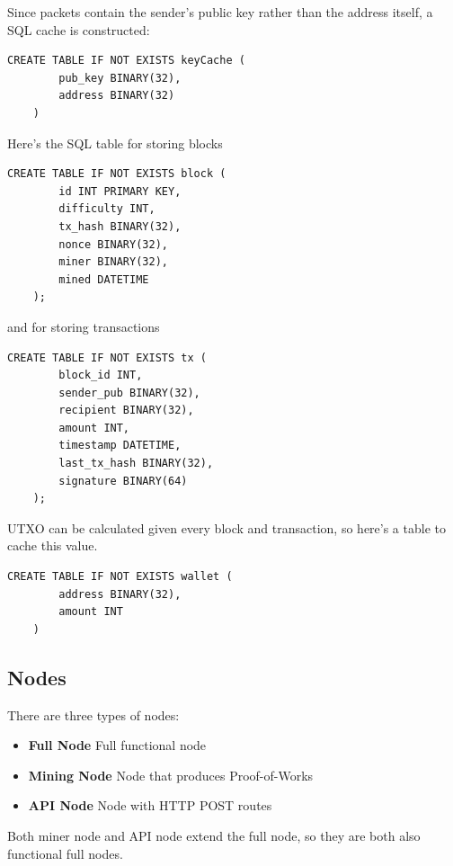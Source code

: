 \documentclass[../documentation.tex]{subfiles}
\begin{document}
Since  packets contain the sender's public key rather than the
address itself, a SQL cache is constructed:

\begin{lstlisting}[style=sql]
	CREATE TABLE IF NOT EXISTS keyCache (
		pub_key BINARY(32),
		address BINARY(32)
	)
\end{lstlisting}

\pagebreak

Here's the SQL table for storing blocks

\begin{lstlisting}[style=sql]
	CREATE TABLE IF NOT EXISTS block (
		id INT PRIMARY KEY,
		difficulty INT,
		tx_hash BINARY(32),
		nonce BINARY(32),
		miner BINARY(32),
		mined DATETIME
	);
\end{lstlisting}

and for storing transactions

\begin{lstlisting}[style=sql]
	CREATE TABLE IF NOT EXISTS tx (
		block_id INT,
		sender_pub BINARY(32),
		recipient BINARY(32),
		amount INT,
		timestamp DATETIME,
		last_tx_hash BINARY(32),
		signature BINARY(64) 
	);
\end{lstlisting}

UTXO can be calculated given every block and transaction,
so here's a table to cache this value.

\begin{lstlisting}[style=sql]
	CREATE TABLE IF NOT EXISTS wallet (
		address BINARY(32),
		amount INT
	)
\end{lstlisting}

\subsection{Nodes}

There are three types of nodes:

\begin{itemize}
    \item \textbf{Full Node} Full functional node
    \item \textbf{Mining Node} Node that produces Proof-of-Works
    \item \textbf{API Node} Node with HTTP POST routes
\end{itemize}

Both miner node and API node extend the full node, so they are both also functional full nodes.
\end{document}
